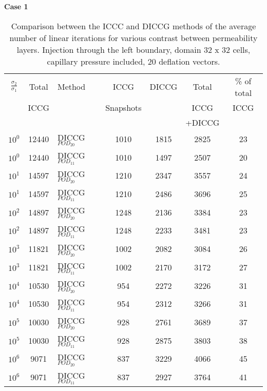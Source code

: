 \documentclass[12pt]{article}
\begin{document}
\textbf{Case 1}\\
\newpage
\begin{table}[!h]\centering
\begin{minipage}{1\textwidth}
 \centering
\begin{tabular}{ ||c|c||l|c|c|c|c||} 
\hline
$\frac{\sigma_2}{\sigma_1}$&Total&Method  & ICCG&DICCG &Total&\% of total\\ 
                           & ICCG     &  & Snapshots& &ICCG& ICCG\\ 
                            &     &  & & &+DICCG& \\
\hline  
$10^{0}$ &12440& DICCG$_{POD_{20}}$&1010&1815&2825&23 \\ 
\hline  
$10^{0}$ &12440& DICCG$_{POD_{11}}$&1010&1497&2507&20 \\ 
\hline  
$10^{1}$ &14597& DICCG$_{POD_{20}}$&1210&2347&3557&24 \\ 
\hline  
$10^{1}$ &14597& DICCG$_{POD_{11}}$&1210&2486&3696&25 \\ 
\hline  
$10^{2}$ &14897& DICCG$_{POD_{20}}$&1248&2136&3384&23 \\ 
\hline  
$10^{2}$ &14897& DICCG$_{POD_{11}}$&1248&2233&3481&23 \\ 
\hline  
$10^{3}$ &11821& DICCG$_{POD_{20}}$&1002&2082&3084&26 \\ 
\hline  
$10^{3}$ &11821& DICCG$_{POD_{11}}$&1002&2170&3172&27 \\ 
\hline  
$10^{4}$ &10530& DICCG$_{POD_{20}}$&954&2272&3226&31 \\ 
\hline  
$10^{4}$ &10530& DICCG$_{POD_{11}}$&954&2312&3266&31 \\ 
\hline  
$10^{5}$ &10030& DICCG$_{POD_{20}}$&928&2761&3689&37 \\ 
\hline  
$10^{5}$ &10030& DICCG$_{POD_{11}}$&928&2875&3803&38 \\ 
\hline  
$10^{6}$ &9071& DICCG$_{POD_{20}}$&837&3229&4066&45 \\ 
\hline  
$10^{6}$ &9071& DICCG$_{POD_{11}}$&837&2927&3764&41 \\ 
\hline  
\end{tabular} 
\caption{Comparison between the ICCC and DICCG methods of the average number of linear iterations for various contrast between permeability layers. Injection through the left boundary, domain 32 x 32 cells, capillary pressure included, 20 deflation vectors.}\label{table:liter1a_1} 
\end{minipage}  
\end{table}
\end{document}
